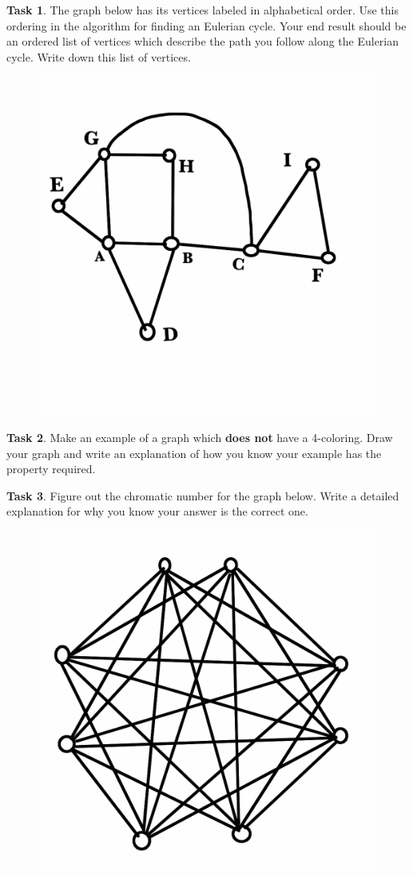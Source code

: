 \documentclass[12pt,letterpaper]{article}
\theoremstyle{definition}
\newtheorem{task}{Task}
\begin{document}
\begin{task}
The graph below has its vertices labeled in alphabetical order. Use this ordering in the algorithm for finding an
Eulerian cycle. Your end result should be an ordered list of vertices which describe the path you follow along 
the Eulerian cycle. Write down this list of vertices.
\begin{figure}[h]
\centering
\includegraphics[width=.4\textwidth]{images/eulerian-hwk.png}
\label{A funny Eulerian graph}
\end{figure}
\end{task}

\begin{task}
Make an example of a graph which \textbf{does not} have a 4-coloring. Draw your graph and write an explanation of 
how you know your example has the property required.
\end{task}

\begin{task}
Figure out the chromatic number for the graph below. Write a detailed explanation for why you know your answer
is the correct one.
\begin{figure}[h]
\centering
\includegraphics[width=.7\textwidth]{images/K2222.png}
\label{A graph with a lot of edges, but only eight vertices}
\end{figure}

\end{task}
\end{document}
